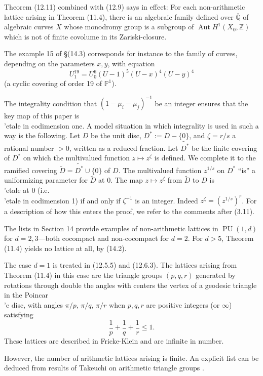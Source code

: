 \documentclass[12pt,a4paper]{article}
\theoremstyle{plain}
\theoremstyle{definition}
\theoremstyle{remark}
\DeclareMathOperator{\Aut}{Aut}
\DeclareMathOperator{\PU}{PU}
\newcommand{\PP}{\mathbb{P}}
\newcommand{\QQ}{\mathbb{Q}}
\newcommand{\ZZ}{\mathbb{Z}}
\numberwithin{equation}{section}
\providecommand{\PP}{\mathbb{P}}
\providecommand{\QQ}{\mathbb{Q}}
\providecommand{\ZZ}{\mathbb{Z}}
\providecommand{\Aut}{\operatorname{Aut}}
\begin{document}
Theorem (12.11) combined with (12.9) says in effect: For each non-arithmetic lattice arising in Theorem (11.4), there is an algebraic family defined over $\overline{\QQ}$ of algebraic curves $X$ whose monodromy group is a subgroup of $\Aut H^1(X_0, \ZZ)$ which is not of finite covolume in its Zariski-closure.

The example 15 of \S (14.3) corresponds for instance to the family of curves, depending on the parameters $x, y$, with equation
\[
U_1^{19} = U_0^6 (U-1)^5 (U-x)^4 (U-y)^4
\]
(a cyclic covering of order 19 of $\PP^1$).

The integrality condition that $(1 - \mu_i - \mu_j)^{-1}$ be an integer ensures that the key map of this paper is \\'etale in codimension one. A model situation in which integrality is used in such a way is the following. Let $D$ be the unit disc, $D^* := D - \{0\}$, and $\zeta = r/s$ a rational number $> 0$, written as a reduced fraction. Let $\widetilde{D^*}$ be the finite covering of $D^*$ on which the multivalued function $z \mapsto z^\zeta$ is defined. We complete it to the ramified covering $\widetilde{D} = \widetilde{D^*} \cup \{0\}$ of $D$. The multivalued function $z^{1/s}$ on $D^*$ ``is'' a uniformizing parameter for $\widetilde{D}$ at $0$. The map $z \mapsto z^\zeta$ from $\widetilde{D}$ to $D$ is \\'etale at $0$ (i.e.\ \\'etale in codimension 1) if and only if $\zeta^{-1}$ is an integer. Indeed $z^\zeta = (z^{1/s})^r$. For a description of how this enters the proof, we refer to the comments after (3.11).

The lists in Section 14 provide examples of non-arithmetic lattices in $\PU(1,d)$ for $d = 2, 3$---both cocompact and non-cocompact for $d = 2$. For $d > 5$, Theorem (11.4) yields no lattice at all, by (14.2).

The case $d = 1$ is treated in (12.5.5) and (12.6.3). The lattices arising from Theorem (11.4) in this case are the triangle groups $(p, q, r)$ generated by rotations through double the angles with centers the vertex of a geodesic triangle in the Poincar\\'e disc, with angles $\pi/p$, $\pi/q$, $\pi/r$ when $p, q, r$ are positive integers (or $\infty$) satisfying
\[
\frac{1}{p} + \frac{1}{q} + \frac{1}{r} \leq 1.
\]
These lattices are described in Fricke-Klein \cite{FrickeKlein} and are infinite in number.

However, the number of arithmetic lattices arising is finite. An explicit list can be deduced from results of Takeuchi on arithmetic triangle groups \cite{Takeuchi}.
\end{document}
